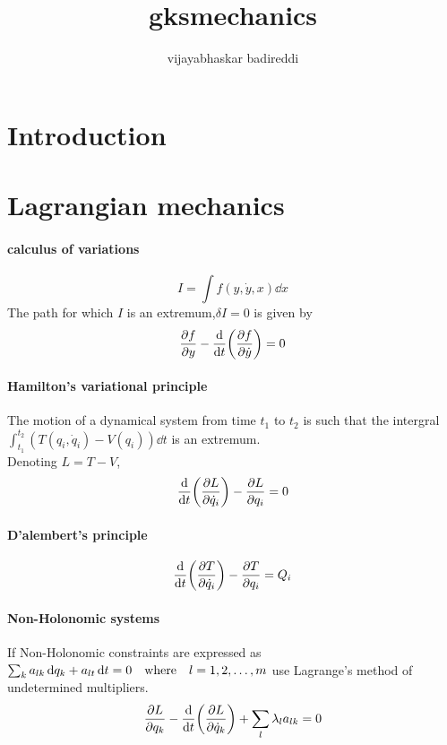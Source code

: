 \documentclass[12pt]{article}
\title{gksmechanics}
\author{vijayabhaskar badireddi}
\begin{document}

\section*{Introduction}

\section*{Lagrangian mechanics}
\paragraph{calculus of variations}
\[I=\int f(y,\dot{y},x)\dd{x}\]
The path for which $I$ is an extremum,$\delta{I}=0$ is given by \[\pdv{f}{y}-\dv{t}\qty(\pdv{f}{\dot{y}})=0\]
\paragraph{Hamilton's variational principle}
The motion of a dynamical system from time $t_1$ to $t_2$ is such that the intergral $\int_{t_1}^{t_2}(T(q_i,\dot{q}_i)-V(q_i))\dd{t}$ is an extremum.\\
Denoting $L=T-V$, \[\dv{t}\qty(\pdv{L}{\dot{q}_i})-\pdv{L}{q_i}=0\]
\paragraph{D'alembert's principle}
\[\dv{t}\qty(\pdv{T}{\dot{q}_i})-\pdv{T}{q_i}=Q_i\]
\paragraph{Non-Holonomic systems}
If Non-Holonomic constraints are expressed as $\sum_ka_{lk}\dd{q_k}+a_{lt}\dd{t}=0\qq{where}l=1,2,\ldots,m$ use Lagrange's method of undetermined multipliers.
\[\pdv{L}{q_k}-\dv{t}\qty(\pdv{L}{\dot{q}_k})+\sum_l\lambda_la_{lk}=0\]
\end{document}
